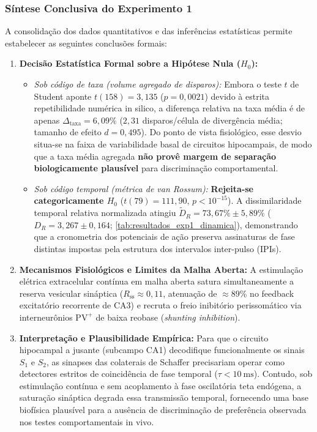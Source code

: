 \documentclass[11pt,a4paper,article,brazil]{abntex2}
\begin{document}
\subsubsection{Síntese Conclusiva do Experimento 1}
A consolidação dos dados quantitativos e das inferências estatísticas permite estabelecer as seguintes conclusões formais:
\begin{enumerate}
    \item \textbf{Decisão Estatística Formal sobre a Hipótese Nula ($H_0$):}
          \begin{itemize}
              \item \emph{Sob código de taxa (volume agregado de disparos):} Embora o teste $t$ de Student aponte $t(158) = 3{,}135$ ($p = 0{,}0021$) devido à estrita repetibilidade numérica in silico, a diferença relativa na taxa média é de apenas $\Delta_{\text{taxa}} = 6{,}09\%$ ($2{,}31$ disparos/célula de divergência média; tamanho de efeito $d = 0{,}495$). Do ponto de vista fisiológico, esse desvio situa-se na faixa de variabilidade basal de circuitos hipocampais, de modo que a taxa média agregada \textbf{não provê margem de separação biologicamente plausível} para discriminação comportamental.
              \item \emph{Sob código temporal (métrica de van Rossum):} \textbf{Rejeita-se categoricamente $H_0$} ($t(79) = 111{,}90$, $p < 10^{-15}$). A dissimilaridade temporal relativa normalizada atingiu $\tilde{D}_R = 73{,}67\% \pm 5{,}89\%$ ($D_R = 3{,}267 \pm 0{,}164$; \cref{tab:resultados_exp1_dinamica}), demonstrando que a cronometria dos potenciais de ação preserva assinaturas de fase distintas impostas pela estrutura dos intervalos inter-pulso (IPIs).
          \end{itemize}
    \item \textbf{Mecanismos Fisiológicos e Limites da Malha Aberta:} A estimulação elétrica extracelular contínua em malha aberta satura simultaneamente a reserva vesicular sináptica ($R_{\text{ss}} \approx 0{,}11$, atenuação de $\approx 89\%$ no feedback excitatório recorrente de CA3) e recruta o freio inibitório perissomático via interneurônios $\text{PV}^+$ de baixa reobase (\emph{shunting inhibition}).
    \item \textbf{Interpretação e Plausibilidade Empírica:} Para que o circuito hipocampal a jusante (subcampo CA1) decodifique funcionalmente os sinais $S_1$ e $S_2$, as sinapses das colaterais de Schaffer precisariam operar como detectores estritos de coincidência de fase temporal ($\tau < \qty{10}{\milli\second}$). Contudo, sob estimulação contínua e sem acoplamento à fase oscilatória teta endógena, a saturação sináptica degrada essa transmissão temporal, fornecendo uma base biofísica plausível para a ausência de discriminação de preferência observada nos testes comportamentais in vivo.
\end{enumerate}
\end{document}
